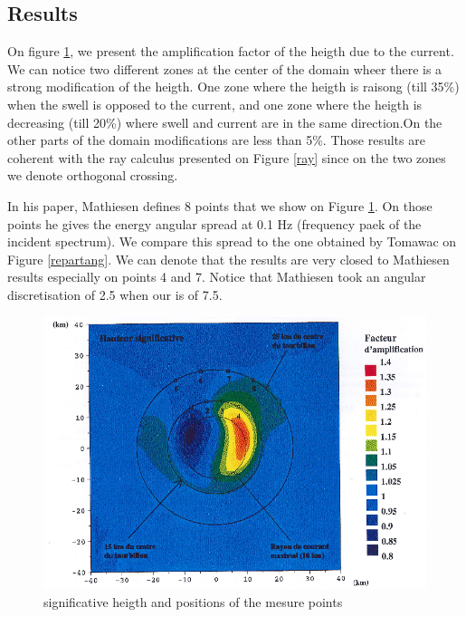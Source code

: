 \subsection{Results}
%
On figure \ref{measurepts}, we present the amplification factor of the heigth
due to the current. We can notice two different zones at the center of the
domain wheer there is a strong modification of the heigth. One zone where the
heigth is raisong (till 35\%) when the swell is opposed to the current, and one
zone where the heigth is decreasing (till 20\%) where swell and current are in
the same direction.On the other parts of the domain modifications are less than
5\%. Those results are coherent with the ray calculus presented on Figure
\ref{ray} since on the two zones we denote orthogonal crossing.

In his paper, Mathiesen \cite{Mathiesen1987} defines 8 points that we show on
Figure \ref{measurepts}. On those points he gives the energy angular spread at
0.1 Hz (frequency paek of the incident spectrum). We compare this spread to the
one obtained by Tomawac on Figure \ref{repartang}. We can denote that the
results are very closed to Mathiesen results especially on points 4 and 7.
Notice that Mathiesen took an angular discretisation of 2.5 when our is of 7.5.

\begin{figure} [!h]
\centering
\includegraphics[scale=0.6]{whirlcurrentpoints.png}
 \caption{significative heigth and positions of the mesure points}
\label{measurepts}
\end{figure}


